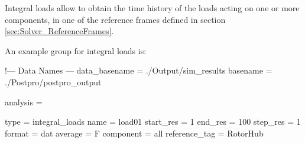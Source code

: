 Integral loads allow to obtain the time history of the loads acting on one 
or more components, in one of the reference frames defined in section 
\ref{sec:Solver_ReferenceFrames}.

An example  group for integral loads is:

\begin{inputfile}[frame=single, caption={dust\_post.in for integral loads}, 
  label={file:dust_post.in_load}]
!--- Data Names ---
data_basename = ./Output/sim_results
basename =     ./Postpro/postpro_output

analysis = {

type = integral_loads
name = load01
start_res = 1
end_res   = 100 
step_res  = 1
format = dat
average = F
component = all
reference_tag = RotorHub

}
\end{inputfile}

